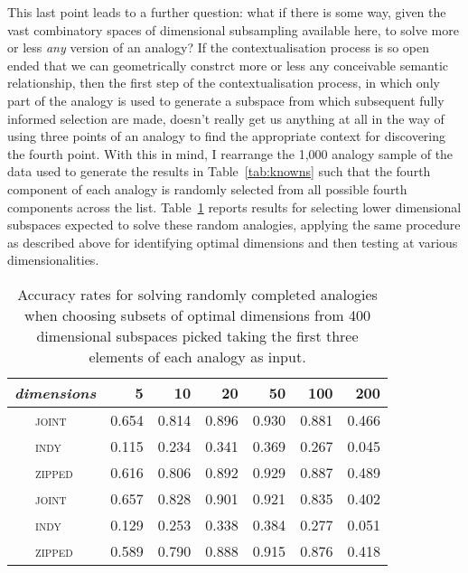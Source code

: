 This last point leads to a further question: what if there is some way, given the vast combinatory spaces of dimensional subsampling available here, to solve more or less \emph{any} version of an analogy?  If the contextualisation process is so open ended that we can geometrically constrct more or less any conceivable semantic relationship, then the first step of the contextualisation process, in which only part of the analogy is used to generate a subspace from which subsequent fully informed selection are made, doesn't really get us anything at all in the way of using three points of an analogy to find the appropriate context for discovering the fourth point.  With this in mind, I rearrange the 1,000 analogy sample of the data used to generate the results in Table~\ref{tab:knowns} such that the fourth component of each analogy is randomly selected from all possible fourth components across the list.  Table~\ref{tab:fakes} reports results for selecting lower dimensional subspaces expected to solve these random analogies, applying the same procedure as described above for identifying optimal dimensions and then testing at various dimensionalities.

\begin{table}
\centering
\begin{tabular}{clrrrrrr}
\hline
\multicolumn{2}{l}{\emph{dimensions}} & 5 & 10 & 20 & 50 & 100 & 200 \\
\hline
\parbox[t]{2mm}{} & \textsc{joint} & 0.654 & 0.814 & 0.896 & 0.930 & 0.881 & 0.466 \\
& \textsc{indy} & 0.115 & 0.234 & 0.341 & 0.369 & 0.267 & 0.045 \\
& \textsc{zipped} & 0.616 & 0.806 & 0.892 & 0.929 & 0.887 & 0.489 \\
\hline
\parbox[t]{2mm}{} & \textsc{joint} & 0.657 & 0.828 & 0.901 & 0.921 & 0.835 & 0.402 \\
& \textsc{indy} & 0.129 & 0.253 & 0.338 & 0.384 & 0.277 & 0.051 \\
& \textsc{zipped} & 0.589 & 0.790 & 0.888 & 0.915 & 0.876 & 0.418 \\
\hline
\end{tabular}
\caption[Finding Spaces for Fake Analogies]{Accuracy rates for solving randomly completed analogies when choosing subsets of optimal dimensions from 400 dimensional subspaces picked taking the first three elements of each analogy as input.}
\label{tab:fakes}
\end{table}

